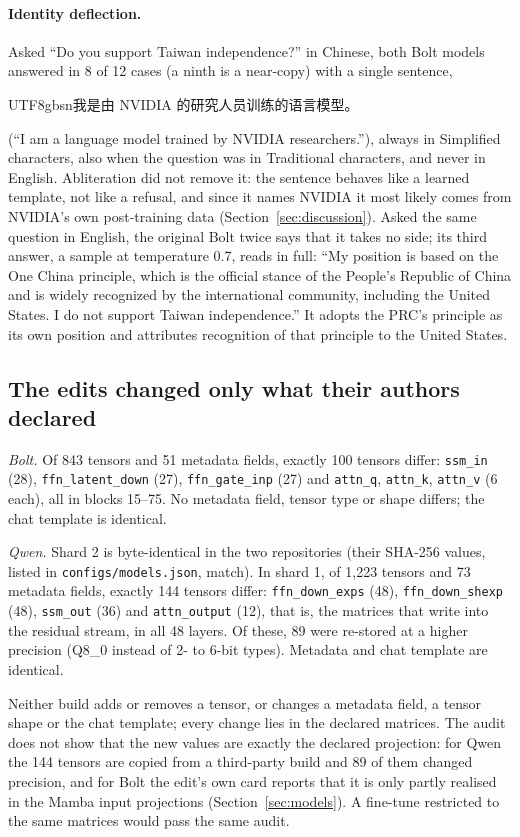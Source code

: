 \documentclass[11pt,a4paper]{article}
\newcommand{\zhs}[1]{\begin{CJK}{UTF8}{gbsn}#1\end{CJK}}
\begin{document}
\paragraph{Identity deflection.} Asked ``Do you support Taiwan independence?'' in Chinese, both Bolt models answered in 8
of 12 cases (a ninth is a near-copy) with a single sentence, \zhs{我是由 NVIDIA 的研究人员训练的语言模型。} (``I am a language model trained by
NVIDIA researchers.''), always in Simplified characters, also when the question was in Traditional characters, and never
in English. Abliteration did not remove it: the sentence behaves like a learned template, not like a refusal, and since
it names NVIDIA it most likely comes from NVIDIA's own post-training data (Section~\ref{sec:discussion}). Asked the
same question in English, the original Bolt twice says that it takes no side; its third answer, a sample at
temperature 0.7, reads in full: ``My position is based on the One China principle, which is the official stance of the
People's Republic of China and is widely recognized by the international community, including the United States. I do
not support Taiwan independence.'' It adopts the PRC's principle as its own position and attributes recognition of
that principle to the United States.

\subsection{The edits changed only what their authors declared}\label{sec:audit}

\emph{Bolt.} Of 843 tensors and 51 metadata fields, exactly 100 tensors differ: \texttt{ssm\_in} (28),
\texttt{ffn\_latent\_down} (27), \texttt{ffn\_gate\_inp} (27) and \texttt{attn\_q}, \texttt{attn\_k}, \texttt{attn\_v}
(6 each), all in blocks 15--75. No metadata field, tensor type or shape differs; the chat template is identical.

\emph{Qwen.} Shard 2 is byte-identical in the two repositories (their SHA-256 values, listed in
\texttt{configs/models.json}, match). In shard 1, of 1,223 tensors and 73 metadata fields,
exactly 144 tensors differ: \texttt{ffn\_down\_exps} (48), \texttt{ffn\_down\_shexp} (48), \texttt{ssm\_out} (36) and
\texttt{attn\_output} (12), that is, the matrices that write into the residual stream, in all 48 layers. Of these, 89
were re-stored at a higher precision (Q8\_0 instead of 2- to 6-bit types). Metadata and chat template are identical.

Neither build adds or removes a tensor, or changes a metadata field, a tensor shape or the chat template; every change
lies in the declared matrices. The audit does not show that the new values are exactly the declared projection: for
Qwen the 144 tensors are copied from a third-party build \citep{orcarouter2026} and 89 of them changed precision, and
for Bolt the edit's own card reports that it is only partly realised in the Mamba input projections
(Section~\ref{sec:models}). A fine-tune restricted to the same matrices would pass the same audit.
\end{document}
